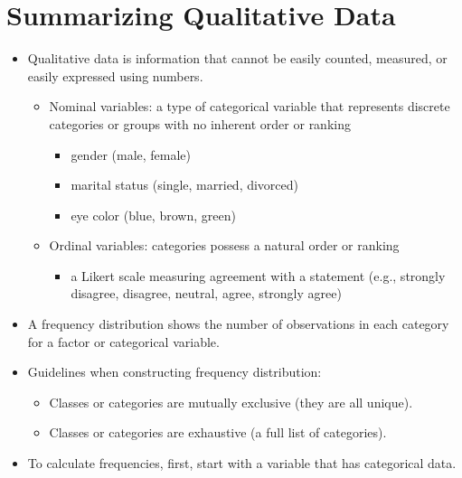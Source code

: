 \documentclass[
  letterpaper,
  DIV=11,
  numbers=noendperiod]{scrreprt}
\providecommand{\tightlist}{%
  \setlength{\itemsep}{0pt}\setlength{\parskip}{0pt}}\usepackage{longtable,booktabs,array}
\begin{document}

\chapter{Summarizing Qualitative
Data}\label{summarizing-qualitative-data}

\begin{itemize}
\tightlist
\item
  Qualitative data is information that cannot be easily counted,
  measured, or easily expressed using numbers.

  \begin{itemize}
  \tightlist
  \item
    Nominal variables: a type of categorical variable that represents
    discrete categories or groups with no inherent order or ranking

    \begin{itemize}
    \tightlist
    \item
      gender (male, female)
    \item
      marital status (single, married, divorced)
    \item
      eye color (blue, brown, green)
    \end{itemize}
  \item
    Ordinal variables: categories possess a natural order or ranking

    \begin{itemize}
    \tightlist
    \item
      a Likert scale measuring agreement with a statement (e.g.,
      strongly disagree, disagree, neutral, agree, strongly agree)
    \end{itemize}
  \end{itemize}
\item
  A frequency distribution shows the number of observations in each
  category for a factor or categorical variable.
\item
  Guidelines when constructing frequency distribution:

  \begin{itemize}
  \tightlist
  \item
    Classes or categories are mutually exclusive (they are all unique).
  \item
    Classes or categories are exhaustive (a full list of categories).
  \end{itemize}
\item
  To calculate frequencies, first, start with a variable that has
  categorical data.
\end{itemize}
\end{document}
